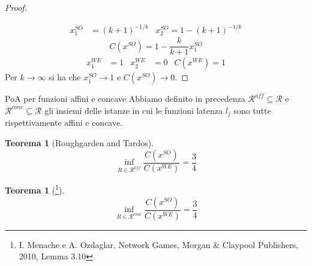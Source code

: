 \documentclass{beamer}
\newcounter{counter1}
\theoremstyle{plain}
\newtheorem{myteo}[counter1]{Teorema}
\theoremstyle{definition}
\theoremstyle{remark}
\newcommand{\pa}[1]{\left(#1\right)}
\begin{document}
\begin{frame}
  \begin{proof}
    \begin{center}
    \end{center}
    \vspace{-25px}
    \begin{align*}
      x^{SO}_1 &= \pa{k+1}^{-1/k} & x^{SO}_2 = 1- \pa{k+1}^{-1/k}
    \end{align*}
    \[ C\pa{x^{SO}} = 1 - \frac{k}{k+1}x^{SO}_1 \]
    \begin{align*}
      x^{WE}_1 &= 1 & x^{WE}_2 &= 0 & C\pa{x^{WE}} = 1
    \end{align*}
    Per $k\to \infty$ si ha che $x^{SO}_1 \to 1$ e $C\pa{x^{SO}}\to 0$.
  \end{proof}
\end{frame}

\begin{frame}{PoA per funzioni affini e concave}
  Abbiamo definito in precedenza
  $\mathcal{R}^{aff} \subseteq \mathcal{R}$ e $\mathcal{R}^{conc}
  \subseteq \mathcal{R}$  gli insiemi delle istanze in
  cui le funzioni latenza $l_j$ sono tutte rispettivamente affini e concave.
  \begin{myteo}[Roughgarden and Tardos]
    \[ \inf _{R\in \mathcal{R}^{aff}} \frac{C\pa{ x^{SO}}}{C\pa{
          x^{WE}}} = \frac{3}{4} \]
  \end{myteo}
  \begin{myteo}[\footnote{I. Menache e A. Ozdaglar, Network Games,
      Morgan \& Claypool Publishers, 2010, Lemma 3.10}]
    \[ \inf _{R\in \mathcal{R}^{conc}} \frac{C\pa{ x^{SO}}}{C\pa{
          x^{WE}}} = \frac{3}{4} \]
  \end{myteo}
\end{frame}
\end{document}
